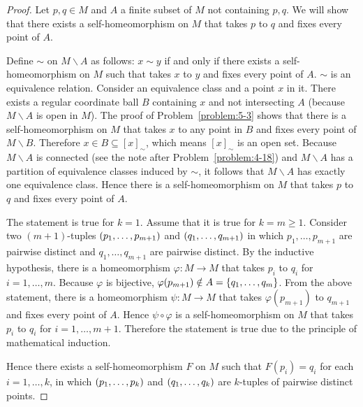 \begin{proof}
	Let \( p, q\in M \) and \( A \) a finite subset of \( M \) not containing \( p, q \). We will show that there exists a self-homeomorphism on \( M \) that takes \( p \) to \( q \) and fixes every point of \( A \).

	Define \( \sim \) on \( M\smallsetminus A \) as follows: \( x \sim y \) if and only if there exists a self-homeomorphism on \( M \) such that takes \( x \) to \( y \) and fixes every point of \( A \). \( \sim \) is an equivalence relation. Consider an equivalence class and a point \( x \) in it. There exists a regular coordinate ball \( B \) containing \( x \) and not intersecting \( A \) (because \( M\smallsetminus A \) is open in \( M \)). The proof of Problem~\ref{problem:5-3} shows that there is a self-homeomorphism on \( M \) that takes \( x \) to any point in \( B \) and fixes every point of \( M\smallsetminus B \). Therefore \( x \in B \subseteq {[x]}_{\sim} \), which means \( {[x]}_{\sim} \) is an open set. Because \( M\smallsetminus A \) is connected (see the note after Problem~\ref{problem:4-18}) and \( M\smallsetminus A \) has a partition of equivalence classes induced by \( \sim \), it follows that \( M\smallsetminus A \) has exactly one equivalence class. Hence there is a self-homeomorphism on \( M \) that takes \( p \) to \( q \) and fixes every point of \( A \).

	The statement is true for \( k = 1 \). Assume that it is true for \( k = m \geq 1 \). Consider two \( (m+1) \)-tuples \( \left({p_{1}, \ldots, p_{m+1}}\right) \) and \( \left({q_{1}, \ldots, q_{m+1}}\right) \) in which \( p_{1}, \ldots, p_{m+1} \) are pairwise distinct and \( q_{1}, \ldots, q_{m+1} \) are pairwise distinct. By the inductive hypothesis, there is a homeomorphism \( \varphi: M\to M \) that takes \( p_{i} \) to \( q_{i} \) for \( i = 1, \ldots, m \). Because \( \varphi \) is bijective, \( \varphi(p_{m+1}) \notin A = \left\{{ q_{1}, \ldots, q_{m} }\right\} \). From the above statement, there is a homeomorphism \( \psi: M\to M \) that takes \( \varphi(p_{m+1}) \) to \( q_{m+1} \) and fixes every point of \( A \). Hence \( \psi\circ\varphi \) is a self-homeomorphism on \( M \) that takes \( p_{i} \) to \( q_{i} \) for \( i = 1, \ldots, m+1 \). Therefore the statement is true due to the principle of mathematical induction.

	Hence there exists a self-homeomorphism \( F \) on \( M \) such that \( F(p_{i}) = q_{i} \) for each \( i = 1, \ldots, k \), in which \( \left({p_{1}, \ldots, p_{k}}\right) \) and \( \left({q_{1}, \ldots, q_{k}}\right) \) are \( k \)-tuples of pairwise distinct points.
\end{proof}

